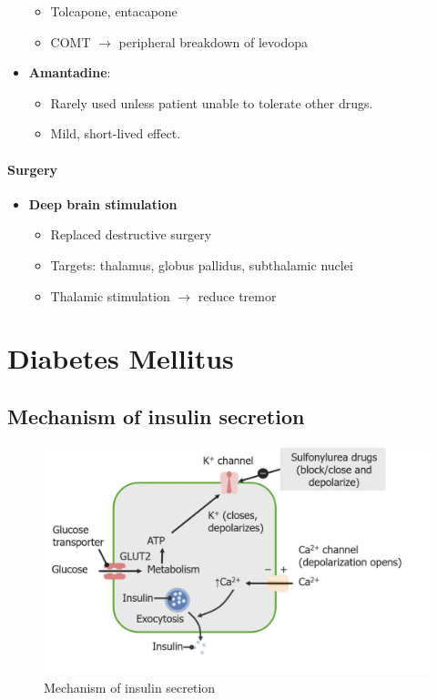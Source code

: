 \documentclass[
  12pt,
]{memoir}
\providecommand{\tightlist}{%
  \setlength{\itemsep}{0pt}\setlength{\parskip}{0pt}}
\begin{document}
\begin{itemize}
  \begin{itemize}
  \tightlist
  \item
    Tolcapone, entacapone
  \item
    COMT \(\rightarrow\) peripheral breakdown of levodopa
  \end{itemize}
\item
  \textbf{Amantadine}:

  \begin{itemize}
  \tightlist
  \item
    Rarely used unless patient unable to tolerate other drugs.
  \item
    Mild, short-lived effect.
  \end{itemize}
\end{itemize}

\hypertarget{surgery}{%
\subsubsection{Surgery}\label{surgery}}

\begin{itemize}
\tightlist
\item
  \textbf{Deep brain stimulation}

  \begin{itemize}
  \tightlist
  \item
    Replaced destructive surgery
  \item
    Targets: thalamus, globus pallidus, subthalamic nuclei
  \item
    Thalamic stimulation \(\rightarrow\) reduce tremor
  \end{itemize}
\end{itemize}

\pagebreak

\hypertarget{diabetes-mellitus}{%
\chapter{Diabetes Mellitus}\label{diabetes-mellitus}}

\hypertarget{mechanism-of-insulin-secretion}{%
\section{Mechanism of insulin
secretion}\label{mechanism-of-insulin-secretion}}

\begin{figure}
\centering
\includegraphics[width=.7\textwidth]{../assets/med/insulin-secr.jpg}
\caption{Mechanism of insulin secretion}
\end{figure}
\end{document}
